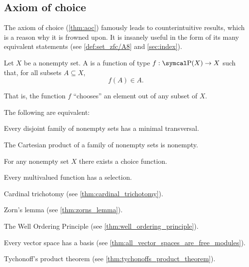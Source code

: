 \subsection{Axiom of choice}\label{subsec:axiom_of_choice}

\begin{remark}\label{remark:aoc}
  The axiom of choice (\cref{thm:aoc}) famously leads to counterintuitive results, which is a reason why it is frowned upon. It is insanely useful in the form of its many equivalent statements (see \cref{def:set_zfc/A8} and \cref{sec:index}).
\end{remark}

\begin{definition}\label{def:choice_function}
  Let \( X \) be a nonempty set. A  is a function of type \( f: \Power(X) \to X \) such that, for all subsets \( A \subseteq X \),
  \begin{equation*}
    f(A) \in A.
  \end{equation*}

  That is, the function \( f \) \enquote{chooses} an element out of any subset of \( X \).
\end{definition}

\begin{theorem}\label{thm:aoc}
  The following are equivalent:

  \begin{thmenum}
    \cite[theorem 6M(4)]{Enderton1977} Every disjoint family of nonempty sets has a minimal transversal.

    \cite[theorem 6M(2)]{Enderton1977} The Cartesian product of a family of nonempty sets is nonempty.

    \cite[theorem 6M(3)]{Enderton1977} For any nonempty set \( X \) there exists a choice function.

    \cite[theorem 6M(1)]{Enderton1977} Every multivalued function has a selection.

     Cardinal trichotomy (see \cref{thm:cardinal_trichotomy}).

     Zorn's lemma (see \cref{thm:zorns_lemma}).

     The Well Ordering Principle (see \cref{thm:well_ordering_principle}).

     Every vector space has a basis (see \cref{thm:all_vector_spaces_are_free_modules}).

     Tychonoff's product theorem (see \cref{thm:tychonoffs_product_theorem}).
  \end{thmenum}
\end{theorem}
